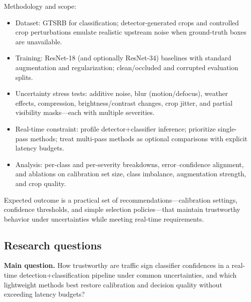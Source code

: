 \documentclass[11pt,a4paper]{article}
\begin{document}
Methodology and scope:

\begin{itemize}
  \item Dataset: GTSRB for classification; detector-generated crops and controlled crop perturbations emulate realistic upstream noise when ground-truth boxes are unavailable.
  \item Training: ResNet-18 (and optionally ResNet-34) baselines with standard augmentation and regularization; clean/occluded and corrupted evaluation splits.
  \item Uncertainty stress tests: additive noise, blur (motion/defocus), weather effects, compression, brightness/contrast changes, crop jitter, and partial visibility masks—each with multiple severities.
  \item Real-time constraint: profile detector+classifier inference; prioritize single-pass methods; treat multi-pass methods as optional comparisons with explicit latency budgets.
  \item Analysis: per-class and per-severity breakdowns, error–confidence alignment, and ablations on calibration set size, class imbalance, augmentation strength, and crop quality.
\end{itemize}

Expected outcome is a practical set of recommendations—calibration settings, confidence thresholds, and simple selection policies—that maintain trustworthy behavior under uncertainties while meeting real-time requirements.

\subsection{Research questions}

\textbf{Main question.} How trustworthy are traffic sign classifier confidences in a real-time detection+classification pipeline under common uncertainties, and which lightweight methods best restore calibration and decision quality without exceeding latency budgets?
\end{document}
